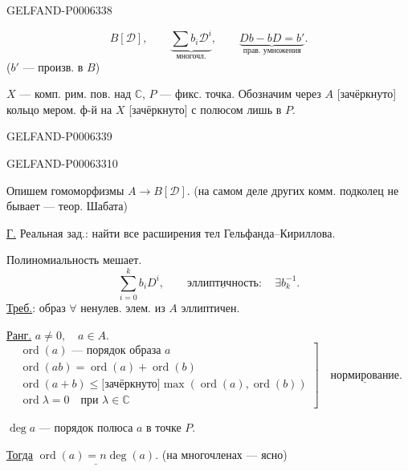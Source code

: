 \begin{GelfandAdjacentEvidence}{GELFAND-P000633}{8}

\[
B[\mathcal D],\qquad
\underbrace{\sum b_i\mathcal D^i}_{\text{многочл.}},\qquad
\underbrace{Db-bD=b'}_{\text{прав. умножения}}.
\]
(\(b'\) --- произв. в \(B\))

\(X\) --- комп. рим. пов. над \(\mathbb C\), \(P\) --- фикс. точка.
Обозначим через \(A\) [зачёркнуто] кольцо мером. ф-й на \(X\) [зачёркнуто]
с полюсом лишь в \(P\).
\end{GelfandAdjacentEvidence}
\begin{GelfandAdjacentEvidence}{GELFAND-P000633}{9}

\end{GelfandAdjacentEvidence}
\begin{GelfandAdjacentEvidence}{GELFAND-P000633}{10}


Опишем гомоморфизмы \(A\to B[\mathcal D]\).
(на самом деле других комм. подколец не бывает --- теор. Шабата)

\underline{Г.} Реальная зад.: найти все расширения тел Гельфанда--Кириллова.

Полиномиальность мешает.
\[
\sum_{i=0}^{k} b_iD^i,\qquad
\underline{\text{эллиптичность}}:\quad\exists b_k^{-1}.
\]
\underline{Треб.}: образ \(\forall\) ненулев. элем. из \(A\) эллиптичен.

\underline{Ранг.} \(a\ne0,\quad a\in A\).
\[
\left.
\begin{gathered}
\operatorname{ord}(a)\text{ --- порядок образа }a\\
\operatorname{ord}(ab)=\operatorname{ord}(a)+\operatorname{ord}(b)\\
\operatorname{ord}(a+b)\le\text{[зачёркнуто]}\max(\operatorname{ord}(a),\operatorname{ord}(b))\\
\operatorname{ord}\lambda=0\quad\text{при }\lambda\in\mathbb C
\end{gathered}
\right]\quad\underline{\text{нормирование}}.
\]
\end{GelfandAdjacentEvidence}

\(\operatorname{deg}a\) --- порядок полюса \(a\) в точке \(P\).

\underline{Тогда} \(\underline{\operatorname{ord}(a)=n\operatorname{deg}(a)}\).
(на многочленах --- ясно)

